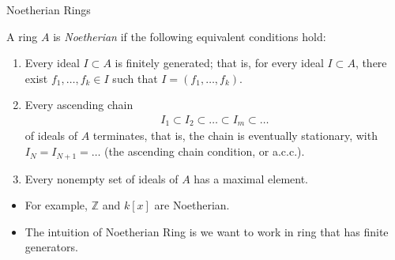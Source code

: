 \documentclass[8pt]{beamer}
\newcommand{\Z}{\mathbb{Z}}
\theoremstyle{definition}
\begin{document}
    \begin{frame}{Noetherian Rings}

        \begin{definition}
            A ring $A$ is \emph{Noetherian} if the following equivalent conditions hold:
            \begin{enumerate}
                \item[(i)] Every ideal $I \subset A$ is finitely generated; that is, for every ideal $I \subset A$, there exist $f_1, \dots, f_k \in I$ such that $I = (f_1, \dots, f_k)$.
                \item[(ii)] Every ascending chain
                \begin{align*}
                    I_1 \subset I_2 \subset \dots \subset I_m \subset \dots
                \end{align*}
                of ideals of $A$ terminates, that is, the chain is eventually stationary, with $I_N = I_{N+1} = \dots$ (the ascending chain condition, or a.c.c.).
                \item[(iii)] Every nonempty set of ideals of $A$ has a maximal element.
            \end{enumerate}
        \end{definition}

        \begin{itemize}
            \item For example, $\Z$ and $k[x]$ are Noetherian.
            \item The intuition of Noetherian Ring is we want to work in ring that has finite generators.
        \end{itemize}

    \end{frame}
\end{document}
